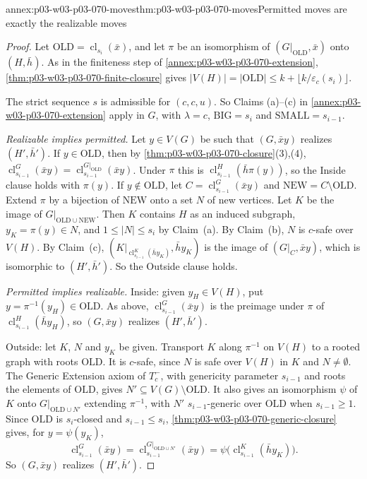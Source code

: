 \begin{annexitem}{annex:p03-w03-p03-070-moves}{thm:p03-w03-p03-070-moves}{Permitted moves are exactly the realizable moves}
\begin{proof}
Let \(\mathrm{OLD}=\operatorname{cl}_{s_i}(\bar x)\), and let \(\pi\) be an
isomorphism of \((G|_{\mathrm{OLD}},\bar x)\) onto \((H,\bar h)\).  As in the
finiteness step of \cref{annex:p03-w03-p03-070-extension},
\cref{thm:p03-w03-p03-070-finite-closure} gives
\(|V(H)|=|\mathrm{OLD}|\leq k+\lfloor k/\varepsilon_c(s_i)\rfloor\).

The strict sequence \(s\) is admissible for \((c,c,u)\).  So Claims (a)--(c)
in \cref{annex:p03-w03-p03-070-extension} apply in \(G\), with
\(\lambda=c\), \(\mathrm{BIG}=s_i\) and \(\mathrm{SMALL}=s_{i-1}\).

\emph{Realizable implies permitted.}  Let \(y\in V(G)\) be such that
\((G,\bar xy)\) realizes \((H',\bar h')\).  If \(y\in\mathrm{OLD}\), then by
\cref{thm:p03-w03-p03-070-closure}(3),(4),
\(\operatorname{cl}^G_{s_{i-1}}(\bar xy)=\operatorname{cl}^{G|_{\mathrm{OLD}}}_{s_{i-1}}(\bar xy)\).
Under \(\pi\) this is \(\operatorname{cl}^H_{s_{i-1}}(\bar h\pi(y))\), so the
Inside clause holds with \(\pi(y)\).  If \(y\notin\mathrm{OLD}\), let
\(C=\operatorname{cl}^G_{s_{i-1}}(\bar xy)\) and \(\mathrm{NEW}=C\setminus\mathrm{OLD}\).
Extend \(\pi\) by a bijection of \(\mathrm{NEW}\) onto a set \(N\) of new
vertices.  Let \(K\) be the image of \(G|_{\mathrm{OLD}\cup\mathrm{NEW}}\).
Then \(K\) contains \(H\) as an induced subgraph, \(y_K=\pi(y)\in N\), and
\(1\leq|N|\leq s_i\) by Claim~(a).  By Claim~(b), \(N\) is \(c\)-safe over
\(V(H)\).  By Claim~(c), \((K|_{\operatorname{cl}^K_{s_{i-1}}(\bar hy_K)},\bar hy_K)\)
is the image of \((G|_C,\bar xy)\), which is isomorphic to \((H',\bar h')\).
So the Outside clause holds.

\emph{Permitted implies realizable.}  Inside: given \(y_H\in V(H)\), put
\(y=\pi^{-1}(y_H)\in\mathrm{OLD}\).  As above,
\(\operatorname{cl}^G_{s_{i-1}}(\bar xy)\) is the preimage under \(\pi\) of
\(\operatorname{cl}^H_{s_{i-1}}(\bar hy_H)\), so \((G,\bar xy)\) realizes
\((H',\bar h')\).

Outside: let \(K\), \(N\) and \(y_K\) be given.  Transport \(K\) along
\(\pi^{-1}\) on \(V(H)\) to a rooted graph with roots \(\mathrm{OLD}\).  It is
\(c\)-safe, since \(N\) is safe over \(V(H)\) in \(K\) and \(N\neq\emptyset\).
The Generic Extension axiom of \(T^-_c\), with genericity parameter
\(s_{i-1}\) and roots the elements of \(\mathrm{OLD}\), gives
\(N'\subseteq V(G)\setminus\mathrm{OLD}\).  It also gives an isomorphism
\(\psi\) of \(K\) onto \(G|_{\mathrm{OLD}\cup N'}\) extending \(\pi^{-1}\),
with \(N'\) \(s_{i-1}\)-generic over \(\mathrm{OLD}\) when \(s_{i-1}\geq1\).
Since \(\mathrm{OLD}\) is \(s_i\)-closed and \(s_{i-1}\leq s_i\),
\cref{thm:p03-w03-p03-070-generic-closure} gives, for \(y=\psi(y_K)\),
\[
 \operatorname{cl}^G_{s_{i-1}}(\bar xy)=\operatorname{cl}^{G|_{\mathrm{OLD}\cup N'}}_{s_{i-1}}(\bar xy)
 =\psi\bigl(\operatorname{cl}^K_{s_{i-1}}(\bar hy_K)\bigr).
\]
So \((G,\bar xy)\) realizes \((H',\bar h')\).
\end{proof}
\end{annexitem}

